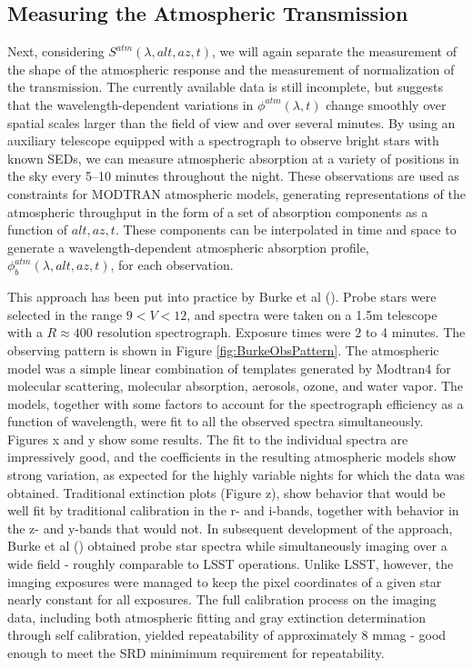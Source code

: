 \documentclass[12pt,preprint]{aastex}
\begin{document}
\subsection{Measuring the Atmospheric Transmission}
\label{sec:atmmeas}
Next, considering $S^{atm}(\lambda,alt,az,t)$, we will again separate
the measurement of the shape of the atmospheric response and the
measurement of normalization of the transmission.  The currently
available data is still incomplete, but suggests that the
wavelength-dependent variations in $\phi^{atm}(\lambda,t)$ change
smoothly over spatial scales larger than the field of view and over
several minutes.  By using an auxiliary telescope equipped with a
spectrograph to observe bright stars with known SEDs, we can measure
atmospheric absorption at a variety of positions in the sky every
5--10 minutes throughout the night. These observations are used as
constraints for MODTRAN atmospheric models, generating representations
of the atmospheric throughput in the form of a set of absorption
components as a function of $alt,az,t$. These components can be
interpolated in time and space to generate a wavelength-dependent
atmospheric absorption profile, $\phi_b^{atm}(\lambda,alt,az,t)$, for
each observation.

This approach has been put into practice by Burke et al (\citep{Burke2010b}).  Probe stars were selected in
the range $9 < V < 12$, and spectra were taken on a 1.5m telescope with a $R \approx 400$ resolution 
spectrograph.  Exposure times were 2 to 4 minutes.  The observing pattern is shown in Figure \ref{fig:BurkeObsPattern}.  
The atmospheric model was a simple linear combination of templates generated by Modtran4 for molecular scattering,
molecular absorption, aerosols, ozone, and water vapor.  The models, together with some factors to account for the
spectrograph efficiency as a function of wavelength, were fit to all the observed spectra simultaneously.   Figures x and y
show some results.   The fit to the individual spectra are impressively good, and the coefficients in the resulting 
atmospheric models show strong variation, as expected for the highly variable nights for which the data was obtained.  
Traditional extinction plots (Figure z), show behavior that would be well fit by traditional calibration in the r- 
and i-bands, together with behavior in the z- and y-bands that would not.  In subsequent development of the approach,
Burke et al (\citep{burke2013}) obtained probe star spectra while simultaneously imaging over a wide field - roughly 
comparable to LSST operations.  Unlike LSST, however, the imaging exposures were managed to keep the pixel coordinates
of a given star nearly constant for all exposures.  The full calibration process on the imaging data, 
including both atmospheric fitting and gray extinction determination through self calibration, yielded repeatability 
of approximately 8 mmag - good enough to meet the SRD minimimum requirement for repeatability.
\end{document}
